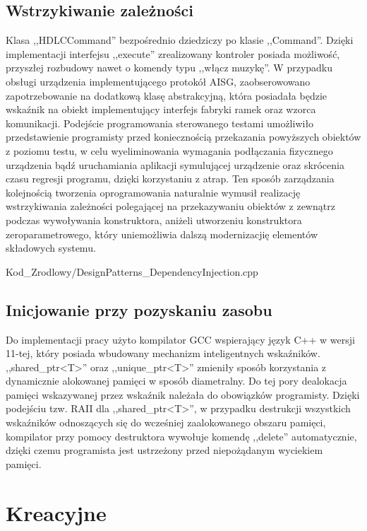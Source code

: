     \subsection{Wstrzykiwanie zależności}
        Klasa ,,HDLCCommand'' bezpośrednio dziedziczy po klasie ,,Command''. Dzięki implementacji interfejsu ,,execute'' zrealizowany kontroler posiada możliwość,
        przyszłej rozbudowy nawet o komendy typu ,,włącz muzykę''. W przypadku obsługi urządzenia implementującego protokół AISG, zaobserowowano zapotrzebowanie
        na dodatkową klasę abstrakcyjną, która posiadała będzie wskaźnik na obiekt implementujący interfejs fabryki ramek oraz wzorca komunikacji.
        Podejście programowania sterowanego testami umożliwiło przedstawienie programisty przed koniecznością przekazania powyższych obiektów z poziomu testu, w celu wyeliminowania
        wymagania podłączania fizycznego urządzenia bądź uruchamiania aplikacji symulującej urządzenie oraz skrócenia czasu regresji programu, dzięki
        korzystaniu z atrap.
        Ten sposób zarządzania kolejnością tworzenia oprogramowania naturalnie wymusił realizację wstrzykiwania zależności polegającej na
        przekazywaniu obiektów z zewnątrz podczas wywoływania konstruktora, aniżeli utworzeniu konstruktora zeroparametrowego, 
        który uniemożliwia dalszą modernizacjię elementów składowych systemu.
        
        {Kod_Zrodlowy/DesignPatterns_DependencyInjection.cpp}
    \subsection{Inicjowanie przy pozyskaniu zasobu}
        Do implementacji pracy użyto kompilator GCC wspierający język C++ w wersji 11-tej, który posiada wbudowany mechanizm inteligentnych wskaźników. ,,shared\_ptr<T>'' oraz ,,unique\_ptr<T>''
        zmieniły sposób korzystania z dynamicznie alokowanej pamięci w sposób diametralny. Do tej pory dealokacja pamięci wskazywanej przez wskaźnik należała do obowiązków programisty.
        Dzięki podejściu tzw. RAII dla ,,shared\_ptr<T>'', w przypadku destrukcji wszystkich wskaźników odnoszących się do wcześniej zaalokowanego obszaru pamięci,
        kompilator przy pomocy destruktora wywołuje komendę ,,delete'' automatycznie, dzięki czemu programista jest ustrzeżony przed niepożądanym wyciekiem pamięci.
\newpage
\section{Kreacyjne}
